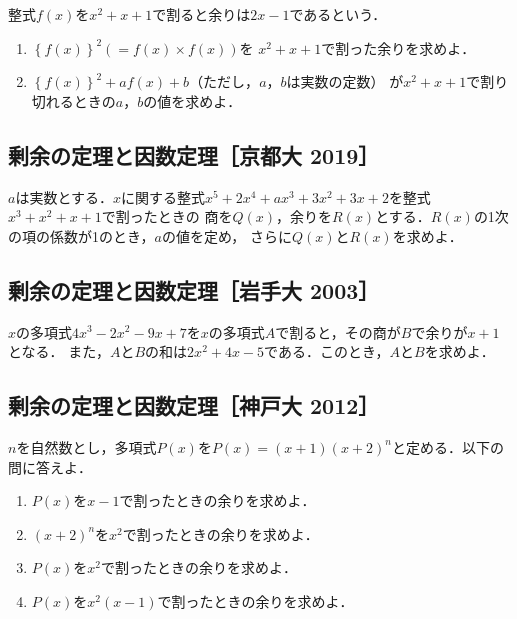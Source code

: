 \documentclass[../all/math-standard_questions_all.tex]{subfiles}
\begin{document}
整式$f(x)$を$x^2+x+1$で割ると余りは$2x-1$であるという．

\begin{enumerate}

    \item $\left\{f(x)\right\}^2\left(=f(x)\times f(x)\right)$を
        $x^2+x+1$で割った余りを求めよ．
    \item $\left\{f(x)\right\}^2+af(x)+b$（ただし，$a$，$b$は実数の定数）
        が$x^2+x+1$で割り切れるときの$a$，$b$の値を求めよ．

\end{enumerate}

\vspace{2cm}
\vfill

\subsection{剰余の定理と因数定理［京都大 2019］}

$a$は実数とする．$x$に関する整式$x^5+2x^4+ax^3+3x^2+3x+2$を整式$x^3+x^2+x+1$で割ったときの
商を$Q(x)$，余りを$R(x)$とする．$R(x)$の1次の項の係数が1のとき，$a$の値を定め，
さらに$Q(x)$と$R(x)$を求めよ．

\vspace{2cm}
\vfill

\subsection{剰余の定理と因数定理［岩手大 2003］}

$x$の多項式$4x^3-2x^2-9x+7$を$x$の多項式$A$で割ると，その商が$B$で余りが$x+1$となる．
また，$A$と$B$の和は$2x^2+4x-5$である．このとき，$A$と$B$を求めよ．

\vspace{2cm}
\vfill

\subsection{剰余の定理と因数定理［神戸大 2012］}

$n$を自然数とし，多項式$P(x)$を$P(x)=(x+1)(x+2)^n$と定める．以下の問に答えよ．

\begin{enumerate}

    \item $P(x)$を$x-1$で割ったときの余りを求めよ．
    
    \item $(x+2)^n$を$x^2$で割ったときの余りを求めよ．
    
    \item $P(x)$を$x^2$で割ったときの余りを求めよ． 

    \item $P(x)$を$x^2(x-1)$で割ったときの余りを求めよ．

\end{enumerate}
\end{document}

